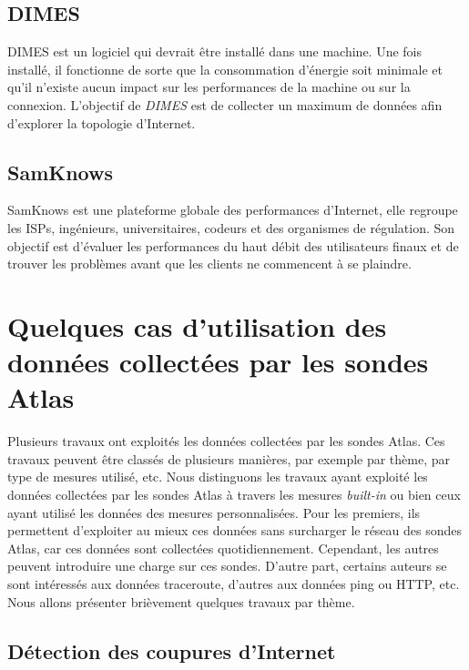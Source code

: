 \subsection{DIMES}
DIMES \cite{Shavitt:2005:DLI:1096536.1096546} est un logiciel qui devrait être installé dans une machine. Une fois installé, il fonctionne de sorte que la consommation d'énergie soit minimale et qu'il n'existe aucun impact sur les performances de la machine ou sur la connexion. L'objectif de \textit{DIMES} est de collecter un maximum de données afin d'explorer la topologie d'Internet.


\subsection{SamKnows}
SamKnows \cite{SamKnows}  est une plateforme globale des performances d'Internet, elle regroupe les ISPs, ingénieurs, universitaires, codeurs et des organismes de régulation. Son objectif est d'évaluer les performances du haut débit des utilisateurs finaux et de trouver les problèmes avant que les clients ne commencent à se plaindre. 

\section{Quelques cas d'utilisation des données collectées par les sondes Atlas} \label{use-cases-atlas}


Plusieurs travaux ont exploités les données collectées par les sondes Atlas. Ces travaux peuvent être classés de plusieurs manières, par exemple  par thème,  par  type de mesures utilisé, etc. Nous distinguons les travaux ayant exploité les données collectées par les sondes Atlas à travers les mesures \textit{built-in} ou bien ceux ayant utilisé les données des mesures personnalisées.  Pour les premiers, ils permettent d'exploiter au mieux ces données sans surcharger le réseau des sondes Atlas, car ces données sont collectées quotidiennement. Cependant, les autres peuvent introduire une charge sur ces sondes. D'autre part, certains auteurs se sont intéressés  aux données traceroute, d'autres aux données ping ou HTTP, etc. Nous allons présenter brièvement quelques travaux par thème.

\subsection{Détection des coupures d'Internet}

